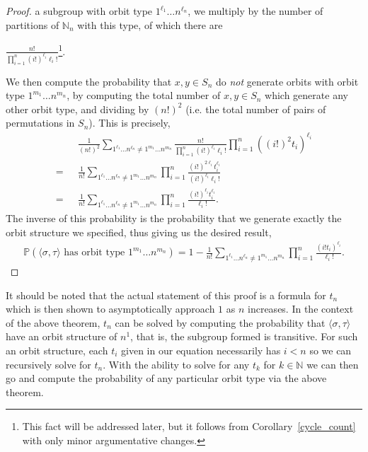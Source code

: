 \begin{proof}
  a subgroup with orbit type $1^{\ell_1}\dots n^{\ell_n}$, we
  multiply by the number of partitions of $\mathbb{N}_n$ with this
  type, of which there are
  \begin{center}
    $\frac{n!}{\prod_{i=1}^n{(i!)^{\ell_i}\ell_i!}}$\footnote{This
      fact will be addressed later, but it follows from
    Corollary~\ref{cycle_count} with only minor argumentative changes.}.
  \end{center}
  We then compute the probability that $x,y\in S_n$ do \emph{not} generate
  orbits with orbit type $1^{m_1}\dots n^{m_n} $, by computing the
  total number of $x,y\in S_n$ which generate any other orbit
  type, and dividing by $(n!)^2$ (i.e. the total number of pairs
  of permutations in $S_n$). This is precisely,
  \begin{align*}
    & {\frac{1}{(n!)^2}\sum_{1^{\ell_1}\dots n^{\ell_n} \ne 1^{m_1}\dots
    n^{m_n}}\frac{n!}{\prod_{i=1}^n{(i!)^{\ell_i}\ell_i!}}}\prod_{i=1}^n{((i!)^2t_i)^{\ell_i}}
    \\
    =\text{ } & \frac{1}{n!}\sum_{1^{\ell_1}\dots n^{\ell_n} \ne
      1^{m_1}\dots
    n^{m_n}}{\prod_{i=1}^n{\frac{(i!)^{2\ell_i}t_i^{\ell_i}}{(i!)^{\ell_i}\ell_i!}}}
    \\
    =\text{ } & \frac{1}{n!}\sum_{1^{\ell_1}\dots n^{\ell_n} \ne
    1^{m_1}\dots n^{m_n}}{\prod_{i=1}^n{\frac{(i!)^{\ell_i}t_i^{\ell_i}}{
    \ell_i!}}}.
  \end{align*}
  The inverse of this probability is the probability that we
  generate exactly the orbit structure we specified, thus giving us
  the desired result,
  \begin{align*}
    \mathbb{P}(\langle\sigma,\tau\rangle\text{ has orbit type
    }1^{m_1}\dots n^{m_n}) = 1-\frac{1}{n!}\sum_{1^{\ell_1}\dots
      n^{\ell_n} \ne 1^{m_1}\dots
    n^{m_n}}\prod_{i=1}^n{\frac{(i!t_{i})^{\ell_i}}{\ell_i!}}.
  \end{align*}
\end{proof}
\noindent It should be noted that the actual statement of this proof
is a formula for $t_n$ which is then shown to asymptotically approach
$1$ as $n$ increases. In the context of the above theorem, $t_n$ can
be solved by computing the probability that $\langle \sigma,
\tau\rangle$ have an orbit structure of $n^1$, that is, the subgroup
formed is transitive. For such an orbit structure, each $t_i$ given
in our equation necessarily has $i < n$ so we can recursively solve
for $t_n$. With the ability to solve for any $t_k$ for
$k\in\mathbb{N}$ we can then go and compute the probability of any
particular orbit type via the above theorem.
